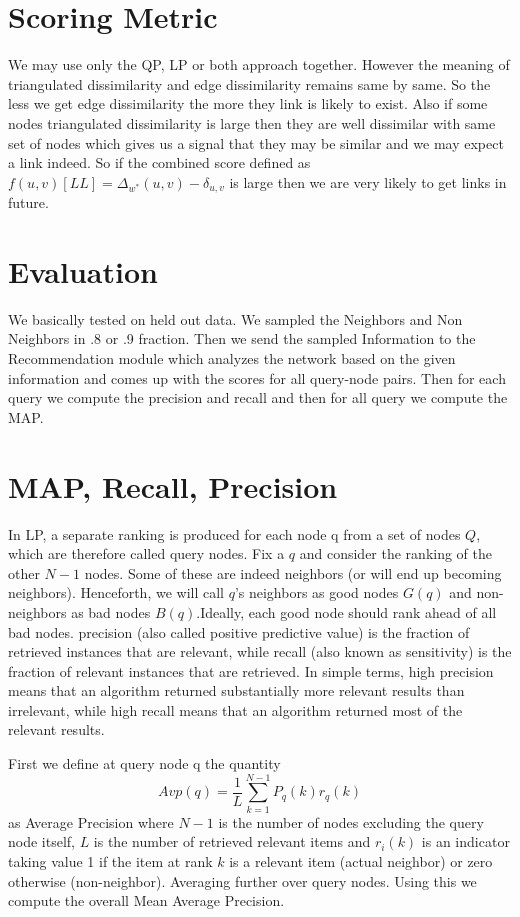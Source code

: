 \documentclass{article}
\begin{document}
\section*{Scoring Metric}
We may use only the QP, LP or both approach together. However the meaning of triangulated dissimilarity and edge dissimilarity remains same by same. So the less we get edge dissimilarity the more they link is likely to exist. Also if some nodes triangulated dissimilarity is large then they are well dissimilar with same set of nodes which gives us a signal that they may be similar and we may expect a link indeed. So if the combined score defined as 
$f(u,v)[LL] = \Delta_{w^{*}}(u,v) - \delta_{u,v}$ is large then we are very likely to get links in future.

\section*{Evaluation}
We basically tested on held out data. We sampled the Neighbors and Non Neighbors in .8 or .9 fraction. Then we send the sampled Information to the Recommendation module which analyzes the network based on the given information and comes up with the scores for all query-node pairs. Then for each query we compute the precision and recall and then for all query we compute the MAP.

\section*{MAP, Recall, Precision }
In LP, a separate ranking is produced for each node q from a set of nodes $Q$, which are  therefore called query nodes. Fix a $q$ and consider the ranking of the other $N - 1$ nodes. Some of these are indeed neighbors (or will end up becoming neighbors). Henceforth, we will call $q$’s neighbors as good nodes $G(q)$ and non-neighbors as bad nodes $B(q)$.Ideally, each good node should rank ahead of all bad nodes. precision (also called positive predictive value) is the fraction of retrieved instances that are relevant, while recall (also known as sensitivity) is the fraction of relevant instances that are retrieved. In simple terms, high precision means that an algorithm returned substantially more relevant results than irrelevant, while high recall means that an algorithm returned most of the relevant results.

First we define at query node q the quantity
\begin{equation}
Avp(q) = \frac{1}{L} \sum_{k = 1}^{N-1} P_{q}(k) r_{q}(k)
\end{equation}
as Average Precision where $N - 1$ is the number of nodes excluding the query node itself, $L$ is the number of retrieved relevant items and $r_{i} (k)$ is an indicator taking value 1 if the item at rank $k$ is a relevant item (actual neighbor) or zero otherwise (non-neighbor). Averaging further over query nodes. Using this we compute the overall Mean Average Precision.
\end{document}
